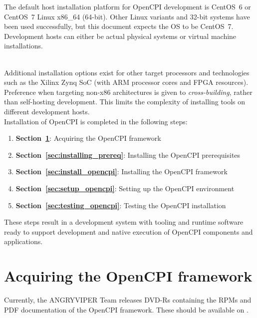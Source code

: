 The default host installation platform for OpenCPI development is CentOS~6 or CentOS~7 Linux x86\_64 (64-bit). Other Linux variants and 32-bit systems have been used successfully, but this document expects the OS to be CentOS~7. Development hosts can either be actual physical systems or virtual machine installations.\\
\begin{center}
\end{center}
\ \\ %
Additional installation options exist for other target processors and technologies such as the Xilinx Zynq SoC (with ARM processor cores and FPGA resources). Preference when targeting non-x86 architectures is given to \textit{cross-building}, rather than self-hosting development. This limits the complexity of installing tools on different development hosts.\\

Installation of OpenCPI is completed in the following steps:
\begin{enumerate}
\item\textbf{Section~\ref{sec:acquiring_opencpi}}: Acquiring the OpenCPI framework
\item\textbf{Section~\ref{sec:installing_prereq}}: Installing the OpenCPI prerequisites
\item\textbf{Section~\ref{sec:install_opencpi}}: Installing the OpenCPI framework
\item\textbf{Section~\ref{sec:setup_opencpi}}: Setting up the OpenCPI environment
\item\textbf{Section~\ref{sec:testing_opencpi}}: Testing the OpenCPI installation
\end{enumerate}
These steps result in a development system with tooling and runtime software ready to support development and native execution of OpenCPI components and applications.

\section{Acquiring the OpenCPI framework}
\label{sec:acquiring_opencpi}
Currently, the ANGRYVIPER Team releases DVD-Rs containing the RPMs and PDF documentation of the OpenCPI framework. These should be available on .


